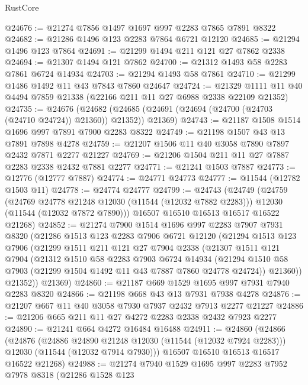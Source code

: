 \begin{lexlean}{RustCore}
\begin{coremodule}
@24676 := @21274 @7856 @1497 @1697 @997 @2283 @7865 @7891 @8322
@24682 := @21286 @1496 @123 @2283 @7864 @6721 @12120
@24685 := @21294 @1496 @123 @7864
@24691 := @21299 @1494 @211 @121 @27 @7862 @2338
@24694 := @21307 @1494 @121 @7862
@24700 := @21312 @1493 @58 @2283 @7861 @6724 @14934
@24703 := @21294 @1493 @58 @7861
@24710 := @21299 @1486 @1492 @11 @43 @7843 @7860 @24647
@24724 := @21329 @1111 @11 @40 @4494 @7859 @21338 (@22166 @211 @11 @27 @6988 @2338 @22109 @21352)
@24735 := @24676
    (@24682 (@24685 (@24691 (@24694 (@24700 (@24703 (@24710 @24724)) @21360)) @21352)) @21369)
@24743 := @21187 @1508 @1514 @1696 @997 @7891 @7900 @2283 @8322
@24749 := @21198 @1507 @43 @13 @7891 @7898 @4278
@24759 := @21207 @1506 @11 @40 @3058 @7890 @7897 @2432 @7871 @2277 @21227
@24769 := @21206 @1504 @211 @11 @27 @7887 @2283 @2338 @2432 @7881 @2277
@24771 := @21241 @1503 @7887
@24773 := @12776 (@12777 @7887)
@24774 := @24771 @24773
@24777 := @11544 (@12782 @1503 @11)
@24778 := @24774 @24777
@24799 := @24743
    (@24749
      (@24759
        (@24769 @24778 @21248 @12030 (@11544 (@12032 @7882 @2283)))
        @12030
        (@11544 (@12032 @7872 @7890)))
      @16507
      @16510
      @16513
      @16517
      @16522
      @21268)
@24852 := @21274
    @7900
    @1514
    @1696
    @997
    @2283
    @7907
    @7931
    @8320
    (@21286
      @1513
      @123
      @2283
      @7906
      @6721
      @12120
      (@21294
        @1513
        @123
        @7906
        (@21299
          @1511
          @211
          @121
          @27
          @7904
          @2338
          (@21307
            @1511
            @121
            @7904
            (@21312
              @1510
              @58
              @2283
              @7903
              @6724
              @14934
              (@21294 @1510 @58 @7903 (@21299 @1504 @1492 @11 @43 @7887 @7860 @24778 @24724))
              @21360))
          @21352))
      @21369)
@24860 := @21187 @669 @1529 @1695 @997 @7931 @7940 @2283 @8320
@24866 := @21198 @668 @43 @13 @7931 @7938 @4278
@24876 := @21207 @667 @11 @40 @3058 @7930 @7937 @2432 @7913 @2277 @21227
@24886 := @21206 @665 @211 @11 @27 @4272 @2283 @2338 @2432 @7923 @2277
@24890 := @21241 @664 @4272 @16484 @16488
@24911 := @24860
    (@24866
      (@24876
        (@24886 @24890 @21248 @12030 (@11544 (@12032 @7924 @2283)))
        @12030
        (@11544 (@12032 @7914 @7930)))
      @16507
      @16510
      @16513
      @16517
      @16522
      @21268)
@24988 := @21274
    @7940
    @1529
    @1695
    @997
    @2283
    @7952
    @7978
    @8318
    (@21286
      @1528
      @123

\end{coremodule}
\end{lexlean}
